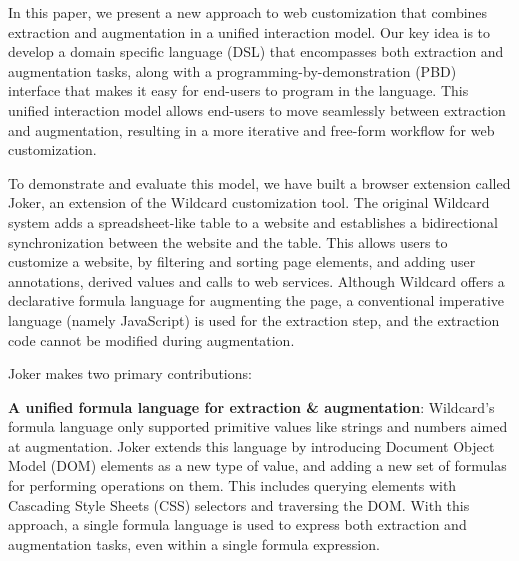 \documentclass[sigconf,10pt]{acmart}
\begin{document}
In this paper, we present a new approach to web customization that
combines extraction and augmentation in a unified interaction model. Our
key idea is to develop a domain specific language (DSL) that encompasses
both extraction and augmentation tasks, along with a
programming-by-demonstration (PBD) interface that makes it easy for
end-users to program in the language. This unified interaction model
allows end-users to move seamlessly between extraction and augmentation,
resulting in a more iterative and free-form workflow for web
customization.

To demonstrate and evaluate this model, we have built a browser
extension called Joker, an extension of the Wildcard customization tool.
The original Wildcard system \citep{litt2020} adds a spreadsheet-like
table to a website and establishes a bidirectional synchronization
between the website and the table. This allows users to customize a
website, by filtering and sorting page elements, and adding user
annotations, derived values and calls to web services. Although Wildcard
offers a declarative formula language for augmenting the page, a
conventional imperative language (namely JavaScript) is used for the
extraction step, and the extraction code cannot be modified during
augmentation.

Joker makes two primary contributions:

\textbf{A unified formula language for extraction \& augmentation}:
Wildcard's formula language only supported primitive values like strings
and numbers aimed at augmentation. Joker extends this language by
introducing Document Object Model (DOM) elements as a new type of value,
and adding a new set of formulas for performing operations on them. This
includes querying elements with Cascading Style Sheets (CSS) selectors
and traversing the DOM. With this approach, a single formula language is
used to express both extraction and augmentation tasks, even within a
single formula expression.
\end{document}
